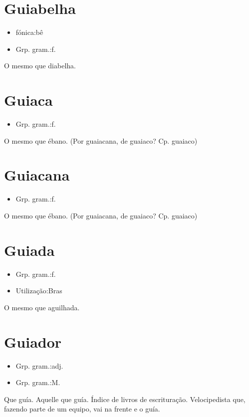 \section{Guiabelha}
\begin{itemize}
\item {fónica:bê}
\end{itemize}
\begin{itemize}
\item {Grp. gram.:f.}
\end{itemize}
O mesmo que \textunderscore diabelha\textunderscore .
\section{Guiaca}
\begin{itemize}
\item {Grp. gram.:f.}
\end{itemize}
O mesmo que \textunderscore ébano\textunderscore .
(Por \textunderscore guaiacana\textunderscore , de \textunderscore guaiaco\textunderscore ? Cp. \textunderscore guaiaco\textunderscore )
\section{Guiacana}
\begin{itemize}
\item {Grp. gram.:f.}
\end{itemize}
O mesmo que \textunderscore ébano\textunderscore .
(Por \textunderscore guaiacana\textunderscore , de \textunderscore guaiaco\textunderscore ? Cp. \textunderscore guaiaco\textunderscore )
\section{Guiada}
\begin{itemize}
\item {Grp. gram.:f.}
\end{itemize}
\begin{itemize}
\item {Utilização:Bras}
\end{itemize}
O mesmo que \textunderscore aguilhada\textunderscore .
\section{Guiador}
\begin{itemize}
\item {Grp. gram.:adj.}
\end{itemize}
\begin{itemize}
\item {Grp. gram.:M.}
\end{itemize}
Que guía.
Aquelle que guía.
Índice de livros de escrituração.
Velocipedista que, fazendo parte de um equipo, vai na frente e o guía.
